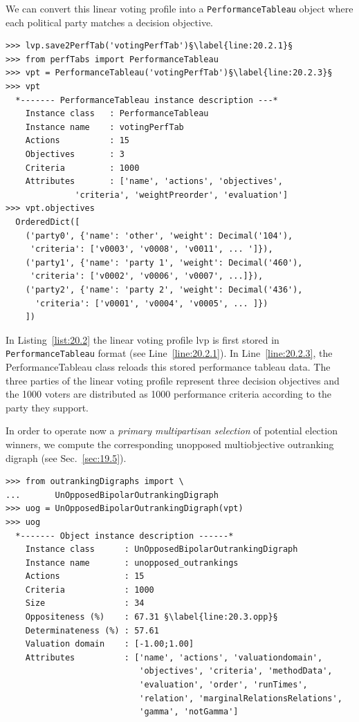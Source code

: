 We can convert this linear voting profile into a \texttt{PerformanceTableau} object where each political party matches a decision objective.
\begin{lstlisting}[caption={Converting a voting profile into a performance tableau},label=list:20.2]
>>> lvp.save2PerfTab('votingPerfTab')§\label{line:20.2.1}§
>>> from perfTabs import PerformanceTableau
>>> vpt = PerformanceTableau('votingPerfTab')§\label{line:20.2.3}§
>>> vpt
  *------- PerformanceTableau instance description ---*
    Instance class   : PerformanceTableau
    Instance name    : votingPerfTab
    Actions          : 15
    Objectives       : 3
    Criteria         : 1000
    Attributes       : ['name', 'actions', 'objectives',
              'criteria', 'weightPreorder', 'evaluation']
>>> vpt.objectives
  OrderedDict([
    ('party0', {'name': 'other', 'weight': Decimal('104'),
     'criteria': ['v0003', 'v0008', 'v0011', ... ']}),
    ('party1', {'name': 'party 1', 'weight': Decimal('460'),
     'criteria': ['v0002', 'v0006', 'v0007', ...]}),
    ('party2', {'name': 'party 2', 'weight': Decimal('436'),
      'criteria': ['v0001', 'v0004', 'v0005', ... ]})
    ])
\end{lstlisting}

In Listing~\vref{list:20.2} the linear voting profile lvp is first stored in \texttt{Performance\-Tableau} format (see Line~\ref{line:20.2.1}). In Line~\ref{line:20.2.3}, the PerformanceTableau class reloads this stored performance tableau data. The three parties of the linear voting profile represent three decision objectives and the 1000 voters are distributed as 1000 performance criteria according to the party they support.

In order to operate now a \emph{primary multipartisan selection} of potential election winners, we compute the corresponding unopposed multiobjective outranking digraph (see Sec.~\ref{sec:19.5}).
\begin{lstlisting}[caption={Computing unopposed multiobjective outranking situations},label=list:20.3]
>>> from outrankingDigraphs import \
...       UnOpposedBipolarOutrankingDigraph
>>> uog = UnOpposedBipolarOutrankingDigraph(vpt)
>>> uog
  *------- Object instance description ------*
    Instance class      : UnOpposedBipolarOutrankingDigraph
    Instance name       : unopposed_outrankings
    Actions             : 15
    Criteria            : 1000
    Size                : 34
    Oppositeness (%)    : 67.31 §\label{line:20.3.opp}§
    Determinateness (%) : 57.61
    Valuation domain    : [-1.00;1.00]
    Attributes          : ['name', 'actions', 'valuationdomain',
                           'objectives', 'criteria', 'methodData',
                           'evaluation', 'order', 'runTimes',
                           'relation', 'marginalRelationsRelations',
                           'gamma', 'notGamma']
\end{lstlisting}

